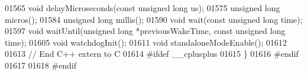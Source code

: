 \begin{DoxyCode}
01565 \textcolor{keywordtype}{void} delayMicroseconds(\textcolor{keyword}{const} \textcolor{keywordtype}{unsigned} \textcolor{keywordtype}{long} us);
01575 \textcolor{keywordtype}{unsigned} \textcolor{keywordtype}{long} micros();
01584 \textcolor{keywordtype}{unsigned} \textcolor{keywordtype}{long} millis();
01590 \textcolor{keywordtype}{void} wait(\textcolor{keyword}{const} \textcolor{keywordtype}{unsigned} \textcolor{keywordtype}{long} time);
01597 \textcolor{keywordtype}{void} waitUntil(\textcolor{keywordtype}{unsigned} \textcolor{keywordtype}{long} *previousWakeTime, \textcolor{keyword}{const} \textcolor{keywordtype}{unsigned} \textcolor{keywordtype}{long} time);
01605 \textcolor{keywordtype}{void} watchdogInit();
01611 \textcolor{keywordtype}{void} standaloneModeEnable();
01612 
01613 \textcolor{comment}{// End C++ extern to C}
01614 \textcolor{preprocessor}{#ifdef \_\_cplusplus}
01615 \}
01616 \textcolor{preprocessor}{#endif}
01617 
01618 \textcolor{preprocessor}{#endif}
\end{DoxyCode}
